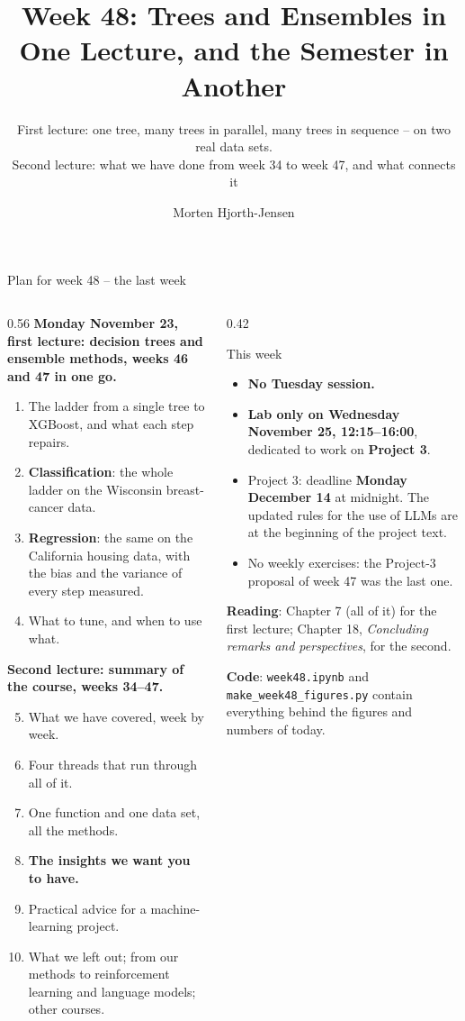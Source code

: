 \documentclass[10pt,aspectratio=169]{beamer}
\title{Week 48: Trees and Ensembles in One Lecture, and the Semester in Another}
\subtitle{First lecture: one tree, many trees in parallel, many trees in
  sequence -- on two real data sets.\\ Second lecture: what we have done from
  week 34 to week 47, and what connects it}
\author{Morten Hjorth-Jensen}
\institute{Department of Physics and Center for Computing in Science Education,\\
  University of Oslo, Norway}
\date{}
\newcounter{insight}
\begin{document}
\begin{frame}
\titlepage
\end{frame}

\begin{frame}{Plan for week 48 -- the last week}
\footnotesize
\begin{columns}[T]
\begin{column}{0.56\textwidth}
\textbf{Monday November 23, first lecture: decision trees and ensemble
methods, weeks 46 and 47 in one go.}
\begin{enumerate}
  \item The ladder from a single tree to XGBoost, and what each step
    repairs.
  \item \textbf{Classification}: the whole ladder on the Wisconsin
    breast-cancer data.
  \item \textbf{Regression}: the same on the California housing data,
    with the bias and the variance of every step measured.
  \item What to tune, and when to use what.
\end{enumerate}
\textbf{Second lecture: summary of the course, weeks 34--47.}
\begin{enumerate}\setcounter{enumi}{4}
  \item What we have covered, week by week.
  \item Four threads that run through all of it.
  \item One function and one data set, all the methods.
  \item \textbf{The insights we want you to have.}
  \item Practical advice for a machine-learning project.
  \item What we left out; from our methods to reinforcement learning and
    language models; other courses.
\end{enumerate}
\end{column}
\begin{column}{0.42\textwidth}
\begin{block}{This week}
\begin{itemize}
  \item \textbf{No Tuesday session.}
  \item \textbf{Lab only on Wednesday November 25, 12:15--16:00}, dedicated
    to work on \textbf{Project 3}.
  \item Project 3: deadline \textbf{Monday December 14} at midnight.  The
    updated rules for the use of LLMs are at the beginning of the project
    text.
  \item No weekly exercises: the Project-3 proposal of week 47 was the last
    one.
\end{itemize}
\end{block}
\textbf{Reading}: Chapter 7 (all of it) for the first lecture; Chapter 18,
\emph{Concluding remarks and perspectives}, for the second.

\textbf{Code}: \texttt{week48.ipynb} and \texttt{make\_week48\_figures.py}
contain everything behind the figures and numbers of today.
\end{column}
\end{columns}
\end{frame}
\end{document}
